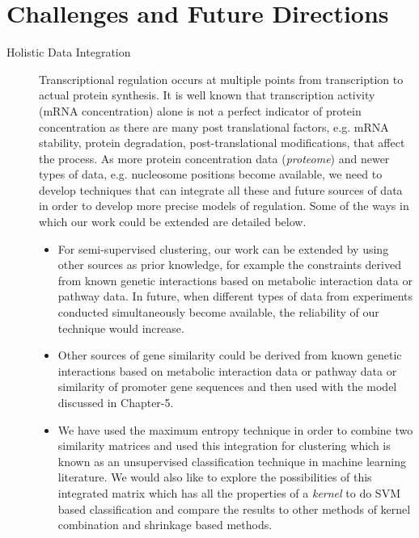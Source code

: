 \section{Challenges and Future Directions}
\begin{description}
\item[Holistic Data Integration] Transcriptional regulation occurs at multiple points from transcription to actual protein synthesis. It is well known that transcription activity (\ac{mRNA} concentration) alone is not a perfect indicator of protein concentration \citep{Griffin02Complementary} as there are many post translational factors, e.g. \ac{mRNA} stability, protein degradation, post-translational modifications, that affect the process. As more protein concentration data (\textit{proteome}) and newer types of data, e.g. nucleosome positions \citep{segal2007genomiccode,field2008distinct,kaplan2008nucleosome} become available, we need to develop techniques that can integrate all these and future sources of data in order to develop more precise models of regulation. Some of the ways in which our work could be extended are detailed below.
\begin{itemize}
    \item For semi-supervised clustering, our work can be extended by using other sources as prior knowledge, for example the constraints derived from known genetic interactions based on metabolic interaction data or pathway data. In future, when different types of data from experiments conducted simultaneously become available, the reliability of our technique would increase.

    \item Other sources of gene similarity could be derived from known genetic interactions based on metabolic interaction data or pathway data or similarity of promoter gene sequences \citep{jean2006kernels} and then used with the model discussed in Chapter-5.

    \item We have used the maximum entropy technique in order to combine two similarity matrices and used this integration for clustering which is known as an unsupervised classification technique in machine learning literature. We would also like to explore the possibilities of this integrated matrix which has all the properties of a \textit{kernel} to do SVM based classification and compare the results to other methods of kernel combination \citep{lanck04kerneldatafusion} and shrinkage based methods.


\end{itemize}
\end{description}
